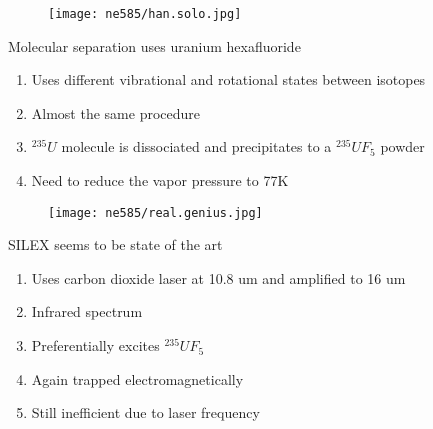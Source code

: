 \documentclass[aspectratio=1610,pdftex,dvipsnames,compress,xcolor={dvipsnames}]{beamer}
\begin{document}
\begin{frame}{}
    \begin{figure}
        \centering
        \texttt{[image: ne585/han.solo.jpg]}
    \end{figure}
\end{frame}


\begin{frame}{Molecular separation uses uranium hexafluoride}
    \begin{enumerate}[topsep=0pt,itemsep=21pt,leftmargin=*,label=(\arabic*)]
        \item[]Uses different vibrational and rotational states between isotopes
        \item[]Almost the same procedure
        \item[]$^{235}U$ molecule is dissociated and precipitates to a $^{235}UF_5$ powder
        \item[]Need to reduce the vapor pressure to 77K
    \end{enumerate}
\end{frame}


\begin{frame}{}
    \begin{figure}
        \centering
        \texttt{[image: ne585/real.genius.jpg]}
    \end{figure}
\end{frame}


\begin{frame}{SILEX seems to be state of the art}
    \begin{enumerate}[topsep=0pt,itemsep=21pt,leftmargin=*,label=(\arabic*)]
        \item[]Uses carbon dioxide laser at 10.8 um and amplified to 16 um
        \item[]Infrared spectrum
        \item[]Preferentially excites $^{235}UF_5$
        \item[]Again trapped electromagnetically
        \item[]Still inefficient due to laser frequency
    \end{enumerate}
\end{frame}
\end{document}
